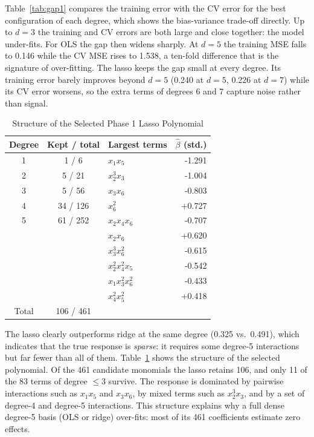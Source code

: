 \documentclass[conference]{IEEEtran}
\begin{document}
Table~\ref{tab:gap1} compares the training error with the CV error for the best configuration of each degree, which shows the bias-variance trade-off directly. Up to $d=3$ the training and CV errors are both large and close together: the model under-fits. For OLS the gap then widens sharply. At $d=5$ the training MSE falls to 0.146 while the CV MSE rises to 1.538, a ten-fold difference that is the signature of over-fitting. The lasso keeps the gap small at every degree. Its training error barely improves beyond $d=5$ (0.240 at $d=5$, 0.226 at $d=7$) while its CV error worsens, so the extra terms of degrees 6 and 7 capture noise rather than signal.

\begin{table}[!t]
\renewcommand{\arraystretch}{1.12}
\caption{Structure of the Selected Phase 1 Lasso Polynomial}
\label{tab:lasso}
\centering\footnotesize
\setlength{\tabcolsep}{4pt}
\begin{tabular}{@{}cc|lr@{}}
\toprule
Degree & Kept / total & Largest terms & $\hat\beta$ (std.) \\
\midrule
1 & 1 / 6 & $x_{1}x_{5}$ & -1.291 \\
2 & 5 / 21 & $x_{2}^{3}x_{3}$ & -1.004 \\
3 & 5 / 56 & $x_{3}x_{6}$ & -0.803 \\
4 & 34 / 126 & $x_{6}^{2}$ & +0.727 \\
5 & 61 / 252 & $x_{2}x_{4}x_{6}$ & -0.707 \\
& & $x_{2}x_{6}$ & +0.620 \\
& & $x_{3}^{3}x_{6}^{2}$ & -0.615 \\
& & $x_{2}^{2}x_{4}^{2}x_{5}$ & -0.542 \\
& & $x_{1}x_{3}^{2}x_{6}^{2}$ & -0.433 \\
& & $x_{4}^{2}x_{5}^{2}$ & +0.418 \\
\midrule
Total & 106 / 461 & & \\
\bottomrule
\end{tabular}
\end{table}

The lasso clearly outperforms ridge at the same degree (0.325 vs.\ 0.491), which indicates that the true response is \emph{sparse}: it requires some degree-5 interactions but far fewer than all of them. Table~\ref{tab:lasso} shows the structure of the selected polynomial. Of the 461 candidate monomials the lasso retains 106, and only 11 of the 83 terms of degree $\le3$ survive. The response is dominated by pairwise interactions such as $x_1x_5$ and $x_3x_6$, by mixed terms such as $x_2^3x_3$, and by a set of degree-4 and degree-5 interactions. This structure explains why a full dense degree-5 basis (OLS or ridge) over-fits: most of its 461 coefficients estimate zero effects.
\end{document}
